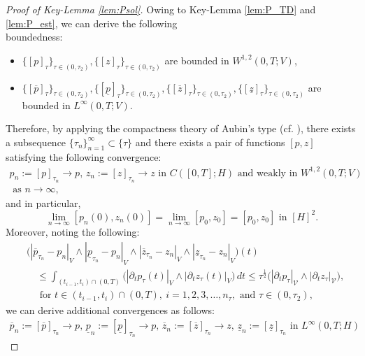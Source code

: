 \documentclass{sinst}
\numberwithin{equation}{section}
\theoremstyle{plain}
\theoremstyle{definition}
\def\sV{\mathscr{V}}
\begin{document}
\begin{proof}[Proof of Key-Lemma \ref{lem:Psol}]
  Owing to Key-Lemma \ref{lem:P_TD} and \ref{lem:P_est}, we can derive the following 
  \\
  boundedness:
  \begin{itemize}
    \item $\{ [p]_\tau \}_{\tau \in (0,\tau_2)}, \{ [z]_\tau \}_{\tau \in (0,\tau_2)}$ are bounded in $W^{1,2}(0,T;V)$,
    \item $\{ [\overline{p}]_\tau \}_{\tau \in (0,\tau_2)}, \{ [\underline{p}]_\tau \}_{\tau \in (0,\tau_2)}, \{ [\overline{z}]_\tau \}_{\tau \in (0,\tau_2)}, \{ [\underline{z}]_\tau \}_{\tau \in (0,\tau_2)}$ are bounded in $L^\infty(0,T;V)$.
  \end{itemize}
  Therefore, by applying the compactness theory of Aubin's type (cf. \cite[Corollary 4]{MR0916688}), there exists a subsequence $\{ \tau_n \}_{n=1}^\infty \subset \{ \tau \}$ and there exists a pair of functions $[p,z]$ satisfying the following convergence:
  \begin{gather}
    p_n := [p]_{\tau_n} \to p, \, z_n := [z]_{\tau_n} \to z \mbox{ in } C([0,T];H) \mbox{ and weakly in } W^{1,2}(0,T;V)
    \\
    \mbox{ as } n \to \infty, \label{P_sol_conv1}
  \end{gather}
  and in particular,
  \begin{equation}
    \lim_{n \to \infty} [p_n(0), z_n(0)] = \lim_{n \to \infty} [p_0, z_0] = [p_0, z_0] \mbox{ in } [H]^2.
  \end{equation}
  Moreover, noting the following:
  \begin{align}
    &\bigl( |\overline{p}_{\tau_n} - p_n|_V \wedge |\underline{p}_{\tau_n} - p_n|_V \wedge |\overline{z}_{\tau_n} - z_n|_V \wedge |\underline{z}_{\tau_n} - z_n|_V \bigr)(t)
    \\
    &\quad \leq \int_{(t_{i-1}, t_i) \cap (0,T)} \bigl( |\partial_t p_\tau(t)|_V \wedge |\partial_t z_\tau(t)|_V \bigr)\,dt \leq \tau^\frac{1}{2} \bigl( |\partial_t p_\tau|_\sV \wedge |\partial_t z_\tau|_\sV \bigr),
    \\
    &\quad \mbox{ for } t \in (t_{i-1}, t_i) \cap (0,T), \ i = 1,2,3,\dots, n_\tau, \mbox{ and } \tau \in (0,\tau_2),
  \end{align}
  we can derive additional convergences as follows:
  \begin{gather}
    \overline{p}_n := [\overline{p}]_{\tau_n} \to p, \, \underline{p}_n := [\underline{p}]_{\tau_n} \to p, \, \overline{z}_n := [\overline{z}]_{\tau_n} \to z, \, \underline{z}_n := [\underline{z}]_{\tau_n} \mbox{ in } L^\infty(0,T;H)

\end{gather}
\end{proof}
\end{document}
